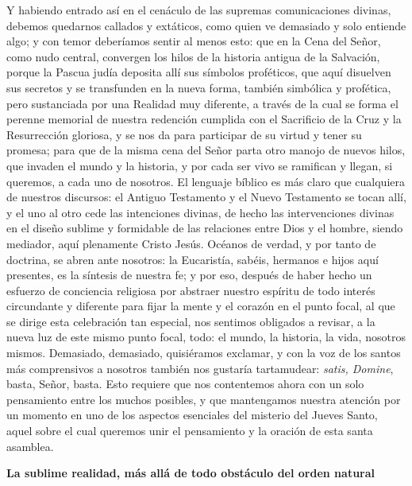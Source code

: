 			\begin{body}Y habiendo entrado así en el cenáculo de las supremas comunicaciones divinas, debemos quedarnos callados y extáticos, como quien ve demasiado y solo entiende algo; y con temor deberíamos sentir al menos esto: que en la Cena del Señor, como nudo central, convergen los hilos de la historia antigua de la Salvación, porque la Pascua judía deposita allí sus símbolos proféticos, que aquí disuelven sus secretos y se transfunden en la nueva forma, también simbólica y profética, pero sustanciada por una Realidad muy diferente, a través de la cual se forma el perenne memorial de nuestra redención cumplida con el Sacrificio de la Cruz y la Resurrección gloriosa, y se nos da para participar de su virtud y tener su promesa; para que de la misma cena del Señor parta otro manojo de nuevos hilos, que invaden el mundo y la historia, y por cada ser vivo se ramifican y llegan, si queremos, a cada uno de nosotros. El lenguaje bíblico es más claro que cualquiera de nuestros discursos: el Antiguo Testamento y el Nuevo Testamento se tocan allí, y el uno al otro cede las intenciones divinas, de hecho las intervenciones divinas en el diseño sublime y formidable de las relaciones entre Dios y el hombre, siendo mediador, aquí plenamente Cristo Jesús. Océanos de verdad, y por tanto de doctrina, se abren ante nosotros: la Eucaristía, sabéis, hermanos e hijos aquí presentes, es la síntesis de nuestra fe; y por eso, después de haber hecho un esfuerzo de conciencia religiosa por abstraer nuestro espíritu de todo interés circundante y diferente para fijar la mente y el corazón en el punto focal, al que se dirige esta celebración tan especial, nos sentimos obligados a revisar, a la nueva luz de este mismo punto focal, todo: el mundo, la historia, la vida, nosotros mismos. Demasiado, demasiado, quisiéramos exclamar, y con la voz de los santos más comprensivos a nosotros también nos gustaría tartamudear: \textit{satis, Domine}, basta, Señor, basta. Esto requiere que nos contentemos ahora con un solo pensamiento entre los muchos posibles, y que mantengamos nuestra atención por un momento en uno de los aspectos esenciales del misterio del Jueves Santo, aquel sobre el cual queremos unir el pensamiento y la oración de esta santa asamblea. \end{body}
			
			\begin{bodycenter}\textbf{La sublime realidad, más allá de todo obstáculo del orden natural }\end{bodycenter}
			
